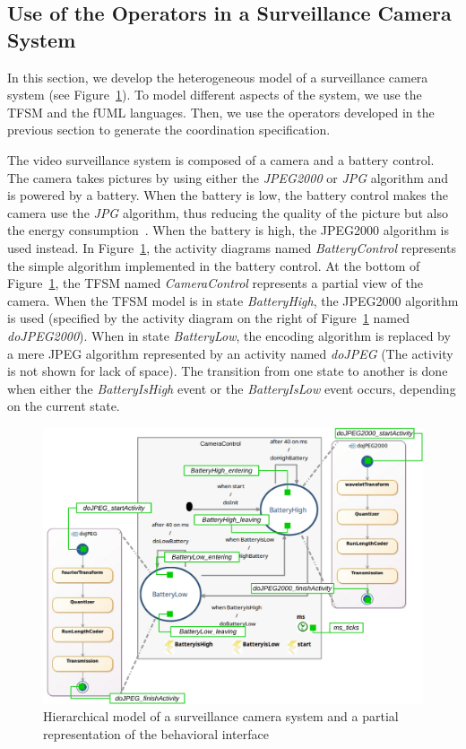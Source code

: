 	\subsection{Use of the Operators in a Surveillance Camera System}
	
		
			
			
	In this section, we develop the heterogeneous model of a surveillance camera system (see Figure~\ref{fig:camerasystem}). To model different aspects of the system, we use the TFSM and the fUML languages. Then, we use the operators developed in the previous section to generate the coordination specification. 
	
	The video surveillance system is composed of a camera and a battery control. The camera takes pictures by using either the \emph{JPEG2000} or \emph{JPG} algorithm and is powered by a battery. When the battery is low, the battery control makes the camera use the \emph{JPG} algorithm, thus reducing the quality of the picture but also the energy consumption~\cite{encodingcomparison}. When the battery is high, the JPEG2000 algorithm is used instead. In Figure~\ref{fig:camerasystem}, the activity diagrams named \emph{BatteryControl} represents the simple algorithm implemented in the battery control. At the bottom of Figure~\ref{fig:camerasystem}, the TFSM named \emph{CameraControl} represents a partial view of the camera. When the TFSM model is in state \emph{BatteryHigh}, the JPEG2000 algorithm is used (specified by the activity diagram on the right of Figure~\ref{fig:camerasystem} named \emph{doJPEG2000}). When in state \emph{BatteryLow}, the encoding algorithm is replaced by a mere JPEG algorithm represented by an activity named \emph{doJPEG} (The activity is not shown for lack of space). The transition from one state to another is done when either the \emph{BatteryIsHigh} event or the \emph{BatteryIsLow} event occurs, depending on the current state.	 
	
	\begin{figure}
		\center
		\includegraphics[width=.7\columnwidth]{examples/figs/picmodels.pdf}
		\caption{Hierarchical model of a surveillance camera system and a partial representation of the behavioral interface}
		\label{fig:camerasystem}
	\end{figure}
	
